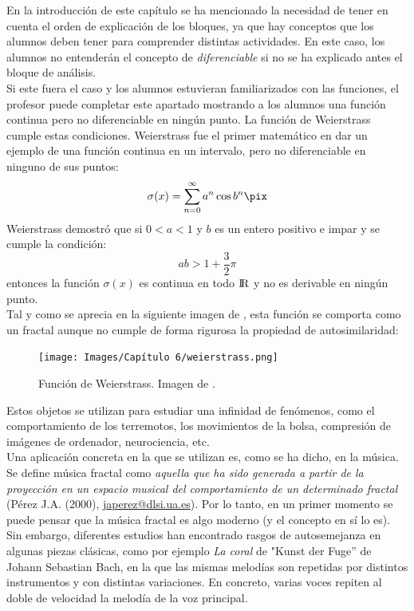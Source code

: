 \documentclass[a4paper, openright, 11pt, titlepage]{report}
\theoremstyle{definition}\newtheorem{defin}[propo]{Definition}
\theoremstyle{definition}\newtheorem{obser}[propo]{Remark}
\theoremstyle{definition}\newtheorem{ejem}[propo]{Ejemplo}
\theoremstyle{definition}\newtheorem{algoritmo}[propo]{Algoritmo}
\begin{document}
\begin{itemize}
\begin{enumerate}
        En la introducción de este capítulo se ha mencionado la necesidad de tener en cuenta el orden de explicación de los bloques, ya que hay conceptos que los alumnos deben tener para comprender distintas actividades. En este caso, los alumnos no entenderán el concepto de \textit{diferenciable} si no se ha explicado antes el bloque de análisis.\\
        Si este fuera el caso y los alumnos estuvieran familiarizados con las funciones, el profesor puede completar este apartado mostrando a los alumnos una función continua pero no diferenciable en ningún punto. La función de Weierstrass cumple estas condiciones. Weierstrass fue el primer matemático en dar un ejemplo de una función continua en un intervalo, pero no diferenciable en ninguno de sus puntos:
        $$\sigma(x) = \sum_{n=0}^{\infty}a^{n}\cos{b^{n}\pix}$$
        Weierstrass demostró que si $0<a<1$ y $b$ es un entero positivo e impar y se cumple la condición:
        $$ab>1+\frac{3}{2}\pi$$
        entonces la función $\sigma(x)$ es continua en todo ${\rm I\!R}$ y no es derivable en ningún punto.\\
        Tal y como se aprecia en la siguiente imagen de \cite{weier}, esta función se comporta como un fractal aunque no cumple de forma rigurosa la propiedad de autosimilaridad:
        \begin{figure}[H]
            \centering
            \texttt{[image: Images/Capítulo 6/weierstrass.png]}
            \caption{Función de Weierstrass. Imagen de \cite{weier}.}
            \label{fig:my_label}
        \end{figure}
    \end{enumerate}
    Estos objetos se utilizan para estudiar una infinidad de fenómenos, como el comportamiento de los terremotos, los movimientos de la bolsa, compresión de imágenes de ordenador, neurociencia, etc.\\
    Una aplicación concreta en la que se utilizan es, como se ha dicho, en la música. \\
    Se define música fractal como \textit{aquella que ha sido generada a partir de la proyección en un espacio musical del comportamiento de un determinado fractal} \cite{fractales} ({Pérez J.A.} (2000), \url{japerez@dlsi.ua.es}). Por lo tanto, en un primer momento se puede pensar que la música fractal es algo moderno (y el concepto en sí lo es). Sin embargo, diferentes estudios han encontrado rasgos de autosemejanza en algunas piezas clásicas, como por ejemplo \textit{La coral} de "Kunst der Fuge'' de Johann Sebastian Bach, en la que las mismas melodías son repetidas por distintos instrumentos y con distintas variaciones. En concreto, varias voces repiten al doble de velocidad la melodía de la voz principal.\\

\end{itemize}
\end{document}
